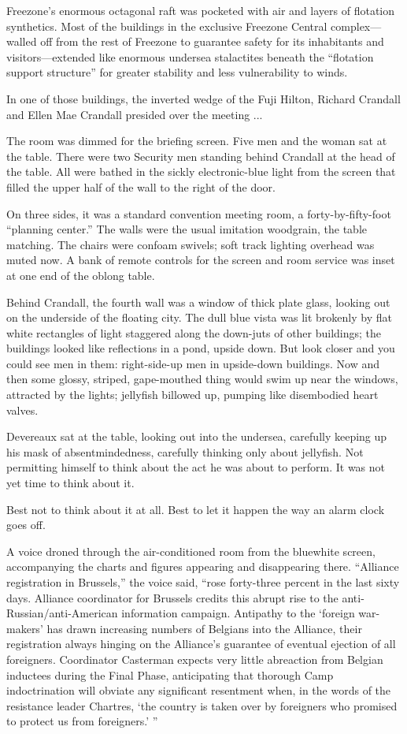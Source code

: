 Freezone's enormous octagonal raft was pocketed with air and layers of flotation synthetics. Most of the buildings in the exclusive Freezone Central complex—walled off from the rest of Freezone to guarantee safety for its inhabitants and visitors—extended like enormous undersea stalactites beneath the ``flotation support structure'' for greater stability and less vulnerability to winds.

In one of those buildings, the inverted wedge of the Fuji Hilton, Richard Crandall and Ellen Mae Crandall presided over the meeting ...

The room was dimmed for the briefing screen. Five men and the woman sat at the table. There were two Security men standing behind Crandall at the head of the table. All were bathed in the sickly electronic-blue light from the screen that filled the upper half of the wall to the right of the door.

On three sides, it was a standard convention meeting room, a forty-by-fifty-foot ``planning center.'' The walls were the usual imitation woodgrain, the table matching. The chairs were confoam swivels; soft track lighting overhead was muted now. A bank of remote controls for the screen and room service was inset at one end of the oblong table.

Behind Crandall, the fourth wall was a window of thick plate glass, looking out on the underside of the floating city. The dull blue vista was lit brokenly by flat white rectangles of light staggered along the down-juts of other buildings; the buildings looked like reflections in a pond, upside down. But look closer and you could see men in them: right-side-up men in upside-down buildings. Now and then some glossy, striped, gape-mouthed thing would swim up near the windows, attracted by the lights; jellyfish billowed up, pumping like disembodied heart valves.

Devereaux sat at the table, looking out into the undersea, carefully keeping up his mask of absentmindedness, carefully thinking only about jellyfish. Not permitting himself to think about the act he was about to perform. It was not yet time to think about it.

Best not to think about it at all. Best to let it happen the way an alarm clock goes off.

A voice droned through the air-conditioned room from the bluewhite screen, accompanying the charts and figures appearing and disappearing there. ``Alliance registration in Brussels,'' the voice said, ``rose forty-three percent in the last sixty days. Alliance coordinator for Brussels credits this abrupt rise to the anti-Russian/anti-American information campaign. Antipathy to the ‘foreign war-makers' has drawn increasing numbers of Belgians into the Alliance, their registration always hinging on the Alliance's guarantee of eventual ejection of all foreigners. Coordinator Casterman expects very little abreaction from Belgian inductees during the Final Phase, anticipating that thorough Camp indoctrination will obviate any significant resentment when, in the words of the resistance leader Chartres, ‘the country is taken over by foreigners who promised to protect us from foreigners.' ''

